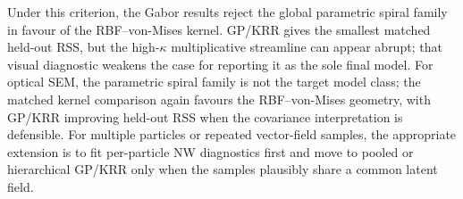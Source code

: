 \documentclass[10pt]{article}
\begin{document}
Under this criterion, the Gabor results reject the global parametric spiral family in favour of the RBF--von-Mises kernel.  GP/KRR gives the smallest matched held-out RSS, but the high-$\kappa$ multiplicative streamline can appear abrupt; that visual diagnostic weakens the case for reporting it as the sole final model.  For optical SEM, the parametric spiral family is not the target model class; the matched kernel comparison again favours the RBF--von-Mises geometry, with GP/KRR improving held-out RSS when the covariance interpretation is defensible.  For multiple particles or repeated vector-field samples, the appropriate extension is to fit per-particle NW diagnostics first and move to pooled or hierarchical GP/KRR only when the samples plausibly share a common latent field.



\end{document}
